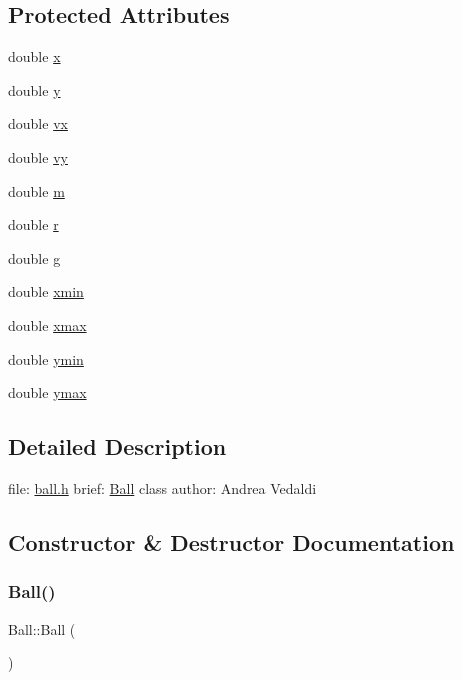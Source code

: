 \subsection*{Protected Attributes}
\begin{DoxyCompactItemize}
\item 
double \hyperlink{classBall_a60894aab5e27e93bacf2393b9110a049}{x}
\item 
double \hyperlink{classBall_a17d73231eab81d0e74cf28d0068fe5cb}{y}
\item 
double \hyperlink{classBall_a4cc3e6d17874d6a99d72657af3bd3a33}{vx}
\item 
double \hyperlink{classBall_aa58f7f56586df265f2fd1d56ce1f0504}{vy}
\item 
double \hyperlink{classBall_a78ecb2a76fb573ad0411b040dfc84e9d}{m}
\item 
double \hyperlink{classBall_aaf3fbb4a93f5efaa933ddd63976f73b5}{r}
\item 
double \hyperlink{classBall_a3573a38b1d3bac62a0bdf7060632bf98}{g}
\item 
double \hyperlink{classBall_ad100dde6b63de229a2bc86b9094526e1}{xmin}
\item 
double \hyperlink{classBall_ab31305d68cd9cd571f119dc9f78d394c}{xmax}
\item 
double \hyperlink{classBall_a01797d790fe45fc9294edece2ff72c5b}{ymin}
\item 
double \hyperlink{classBall_ada883fa45e2bc0cbcd04fec775bfcc89}{ymax}
\end{DoxyCompactItemize}


\subsection{Detailed Description}
file\+: \hyperlink{ball_8h}{ball.\+h} brief\+: \hyperlink{classBall}{Ball} class author\+: Andrea Vedaldi 

\subsection{Constructor \& Destructor Documentation}
\mbox{\label{classBall_a86a144d3dad6c953e422e32435923bbb}} 
\subsubsection{\texorpdfstring{Ball()}{Ball()}}
{\footnotesize\ttfamily Ball\+::\+Ball (\begin{DoxyParamCaption}{ }\end{DoxyParamCaption})}

